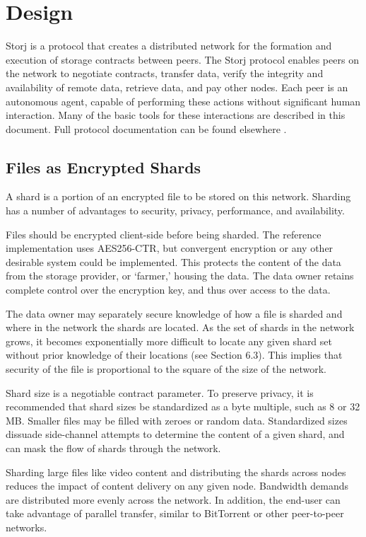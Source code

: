 \documentclass[a4paper,10pt]{article}
\begin{document}
\section{Design}
Storj is a protocol that creates a distributed network for the formation and execution of storage contracts between peers. The Storj protocol enables peers on the network to negotiate contracts, transfer data, verify the integrity and availability of remote data, retrieve data, and pay other nodes. Each peer is an autonomous agent, capable of performing these actions without significant human interaction. Many of the basic tools for these interactions are described in this document. Full protocol documentation can be found elsewhere \cite{1}.

\subsection{Files as Encrypted Shards}
A shard is a portion of an encrypted file to be stored on this network. Sharding has a number of advantages to security, privacy, performance, and availability.

Files should be encrypted client-side before being sharded. The reference implementation uses AES256-CTR, but convergent encryption or any other desirable system could be implemented. This protects the content of the data from the storage provider, or ‘farmer,’ housing the data. The data owner retains complete control over the encryption key, and thus over access to the data.

The data owner may separately secure knowledge of how a file is sharded and where in the network the shards are located. As the set of shards in the network grows, it becomes exponentially more difficult to locate any given shard set without prior knowledge of their locations (see Section 6.3). This implies that security of the file is proportional to the square of the size of the network.

Shard size is a negotiable contract parameter. To preserve privacy, it is recommended that shard sizes be standardized as a byte multiple, such as 8 or 32 MB. Smaller files may be filled with zeroes or random data. Standardized sizes dissuade side-channel attempts to determine the content of a given shard, and can mask the flow of shards through the network.

Sharding large files like video content and distributing the shards across nodes reduces the impact of content delivery on any given node. Bandwidth demands are distributed more evenly across the network. In addition, the end-user can take advantage of parallel transfer, similar to BitTorrent \cite{24} or other peer-to-peer networks.
\end{document}
